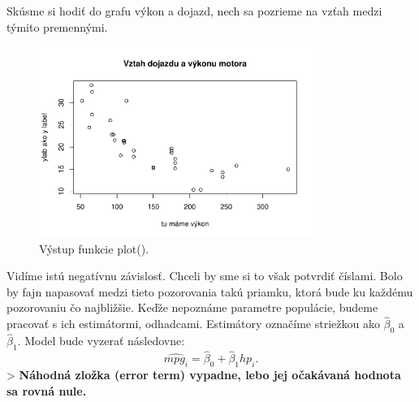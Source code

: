Skúsme si hodiť do grafu výkon a dojazd, nech sa pozrieme na vzťah medzi
týmito premennými.

\begin{Shaded}
\begin{Highlighting}[]

\NormalTok{(}\OperatorTok{$}\OperatorTok{$} \NormalTok{, }
       
\end{Highlighting}
\end{Shaded}

\begin{figure}
\begin{center}
    \includegraphics[width=0.8\textwidth,height=\textheight]{test_files/figure-latex/unnamed-chunk-39-1.pdf}
    \caption{Výstup funkcie plot().}
\end{center}
\end{figure}

\newpage

Vidíme istú negatívnu závislosť. Chceli by sme si to však potvrdiť
číslami. Bolo by fajn napasovať medzi tieto pozorovania takú priamku,
ktorá bude ku každému pozorovaniu čo najbližšie. Keďže nepoznáme
parametre populácie, budeme pracovať s ich estimátormi, odhadcami.
Estimátory označíme striežkou ako \(\hat\beta_0{}\) a \(\hat\beta_1{}\).
Model bude vyzerať následovne:
\[\hat{mpg_i} = \hat\beta_0 + \hat \beta_1{hp_i}.\] \textgreater{}
\textbf{Náhodná zložka (error term) vypadne, lebo jej očakávaná hodnota
sa rovná nule.}

